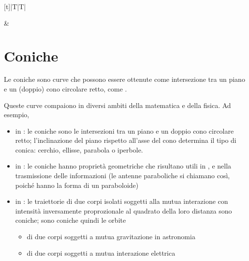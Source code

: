 \documentclass[letterpaper,10pt,italian]{jupyterBook}
\begin{document}
\begin{savenotes}\sphinxattablestart
\centering
\begin{tabulary}{\linewidth}[t]{|T|T|}
\hline

\sphinxAtStartPar
{}
&
\sphinxAtStartPar
{}
\\
\hline
\end{tabulary}
\par
\sphinxattableend\end{savenotes}

\sphinxstepscope


\section{Coniche}
\label{\detokenize{ch/analytic_geometry/analytic_geometry_2d/conics:coniche}}\label{\detokenize{ch/analytic_geometry/analytic_geometry_2d/conics:geometry-analytic-2d-conics}}\label{\detokenize{ch/analytic_geometry/analytic_geometry_2d/conics::doc}}
\sphinxAtStartPar
Le coniche sono curve che possono essere ottenute come intersezione tra un piano e un (doppio) cono circolare retto, come {\hyperref[\detokenize{ch/analytic_geometry/analytic_geometry_3d/cone:geometry-analytic-3d-cone-conics}]{}}.

\sphinxAtStartPar
Queste curve compaiono in diversi ambiti della matematica e della fisica. Ad esempio,
\begin{itemize}
\item {} 
\sphinxAtStartPar
in : le coniche sono le intersezioni tra un piano e un doppio cono circolare retto; l’inclinazione del piano rispetto all’asse del cono determina il tipo di conica: cerchio, ellisse, parabola o iperbole.

\item {} 
\sphinxAtStartPar
in : le coniche hanno proprietà geometriche che risultano utili in , e nella trasmissione delle informazioni (le antenne paraboliche si chiamano così, poiché hanno la forma di un paraboloide)

\item {} 
\sphinxAtStartPar
in : le traiettorie di due corpi isolati soggetti alla mutua interazione con intensità inversamente proprozionale al quadrato della loro distanza sono coniche; sono coniche quindi le orbite
\begin{itemize}
\item {} 
\sphinxAtStartPar
di due corpi soggetti a mutua gravitazione in astronomia

\item {} 
\sphinxAtStartPar
di due corpi soggetti a mutua interazione elettrica

\end{itemize}

\end{itemize}
\end{document}
